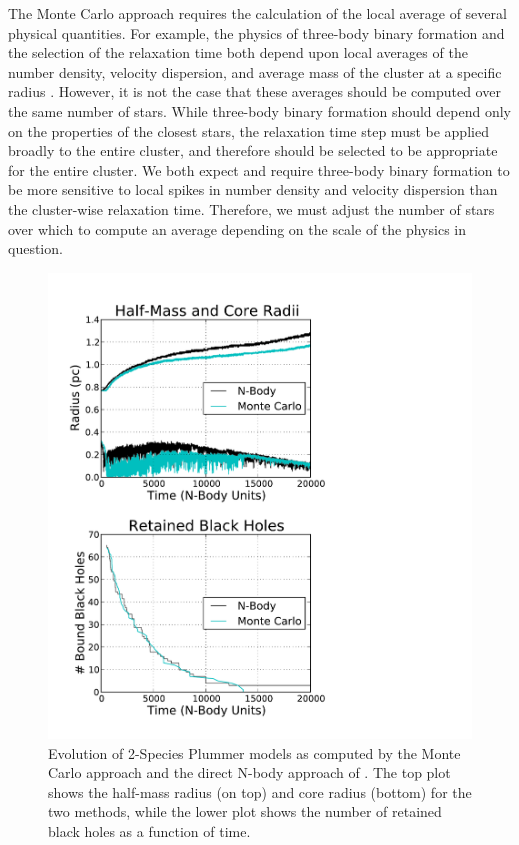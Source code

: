 \documentclass[12pt,preprint]{aastex}
\begin{document}
The Monte Carlo approach requires the calculation of the local average of several
physical quantities.  For example, the physics of three-body binary formation and the
selection of the relaxation time both depend upon
local averages of the number density, velocity dispersion, and average mass of
the cluster at a specific radius \citep{Joshi2000}.
However, it is not the case that these averages should be computed over the same
number of stars.   While three-body binary formation should depend only on the
properties of the closest stars, the relaxation time step must be applied broadly to
 the entire cluster, and therefore should be selected to be appropriate for the entire cluster.
 We both expect and require three-body binary
formation to be more sensitive to local spikes in number density and velocity
dispersion than the cluster-wise relaxation time.  Therefore, we must adjust the
number of stars over which to compute an average depending on the scale of the
physics in question.

\begin{figure}[h!]
  \includegraphics[scale=0.65]{64.pdf}
  \caption{Evolution of 2-Species Plummer models as computed by the Monte Carlo
  approach and the direct N-body approach of \cite{Breen2013}.  The
  top plot shows the half-mass radius (on top) and core radius (bottom) for the
  two methods, while the lower plot shows the number of retained black holes as
  a function of time.}
  \label{fig:2species64k}
\end{figure}
\end{document}
